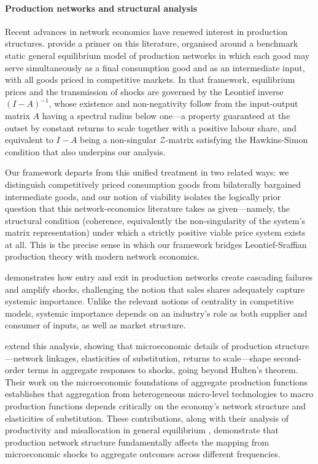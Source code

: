 \documentclass[11pt,fleqn]{article}
\begin{document}
\paragraph{Production networks and structural analysis}

Recent advances in network economics have renewed interest in production structures. \citet{Carvalho2019} provide a primer on this literature, organised around a benchmark static general equilibrium model of production networks in which each good may serve simultaneously as a final consumption good and as an intermediate input, with all goods priced in competitive markets. In that framework, equilibrium prices and the transmission of shocks are governed by the Leontief inverse $(I-A)^{-1}$, whose existence and non-negativity follow from the input-output matrix $A$ having a spectral radius below one---a property guaranteed at the outset by constant returns to scale together with a positive labour share, and equivalent to $I-A$ being a non-singular $\mathcal Z$-matrix satisfying the Hawkins-Simon condition that also underpins our analysis. 

Our framework departs from this unified treatment in two related ways: we distinguish competitively priced consumption goods from bilaterally bargained intermediate goods, and our notion of viability isolates the logically prior question that this network-economics literature takes as given---namely, the structural condition (coherence, equivalently the non-singularity of the system's matrix representation) under which a strictly positive viable price system exists at all. This is the precise sense in which our framework bridges Leontief-Sraffian production theory with modern network economics. 

\citet{Baqaee2018} demonstrates how entry and exit in production networks create cascading failures and amplify shocks, challenging the notion that sales shares adequately capture systemic importance. Unlike the relevant notions of centrality in competitive models, systemic importance depends on an industry's role as both supplier and consumer of inputs, as well as market structure. 

\citet{Baqaee2019} extend this analysis, showing that microeconomic details of production structure---network linkages, elasticities of substitution, returns to scale---shape second-order terms in aggregate responses to shocks, going beyond Hulten's theorem. Their work on the microeconomic foundations of aggregate production functions \citep{BaqaeeFarhi2019} establishes that aggregation from heterogeneous micro-level technologies to macro production functions depends critically on the economy's network structure and elasticities of substitution. These contributions, along with their analysis of productivity and misallocation in general equilibrium \citep{BaqaeeFarhi2020}, demonstrate that production network structure fundamentally affects the mapping from microeconomic shocks to aggregate outcomes across different frequencies. 
\end{document}
